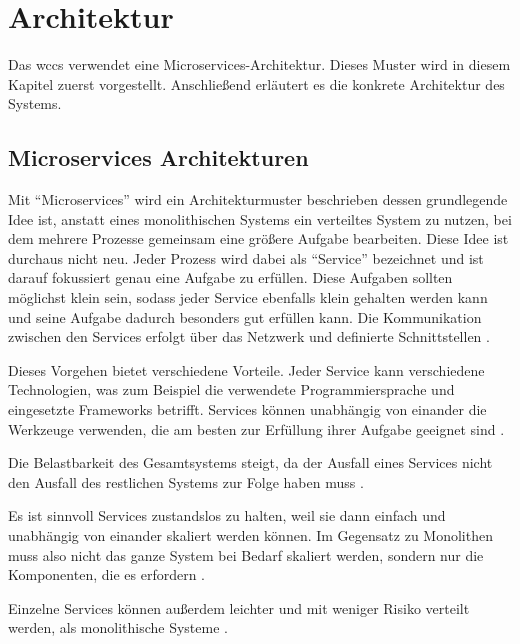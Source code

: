 \section{Architektur}
    \label{section:Architecture}
    Das \gls{wccs} verwendet eine Microservices-Architektur.
    Dieses Muster wird in diesem Kapitel zuerst vorgestellt.
    Anschließend erläutert es die konkrete Architektur des Systems.

    \subsection{Microservices Architekturen}
        \label{section:conceptMicroServices}
        Mit "`Microservices"' wird ein Architekturmuster beschrieben
        dessen grundlegende Idee ist, anstatt eines monolithischen Systems
        ein verteiltes System zu nutzen, bei dem mehrere Prozesse gemeinsam
        eine größere Aufgabe bearbeiten.
        Diese Idee ist durchaus nicht neu.
        Jeder Prozess wird dabei als "`Service"' bezeichnet und ist darauf
        fokussiert genau eine Aufgabe zu erfüllen.
        Diese Aufgaben sollten möglichst klein sein,
        sodass jeder Service ebenfalls klein gehalten werden kann und seine
        Aufgabe dadurch besonders gut erfüllen kann.
        Die Kommunikation zwischen den Services erfolgt über das Netzwerk
        und definierte Schnittstellen
        \cite[Kapitel 1.1]{newman:microservices}.

        Dieses Vorgehen bietet verschiedene Vorteile.
        Jeder Service kann verschiedene Technologien,
        was zum Beispiel die verwendete Programmiersprache und eingesetzte Frameworks betrifft.
        Services können unabhängig von einander die Werkzeuge verwenden,
        die am besten zur Erfüllung ihrer Aufgabe geeignet sind
        \cite[Kapitel 1.2.1]{newman:microservices}.

        Die Belastbarkeit des Gesamtsystems steigt,
        da der Ausfall eines Services nicht den Ausfall des restlichen Systems
        zur Folge haben muss
        \cite[Kapitel 1.2.2]{newman:microservices}.
        
        Es ist sinnvoll Services zustandslos zu halten,
        weil sie dann einfach und unabhängig von einander skaliert werden können.
        Im Gegensatz zu Monolithen muss also nicht das ganze System bei Bedarf skaliert werden,
        sondern nur die Komponenten, die es erfordern
        \cite[Kapitel 1.2.3]{newman:microservices}.

        Einzelne Services können außerdem leichter und mit weniger Risiko
        verteilt werden, als monolithische Systeme
        \cite[Kapitel 1.2.4]{newman:microservices}.

